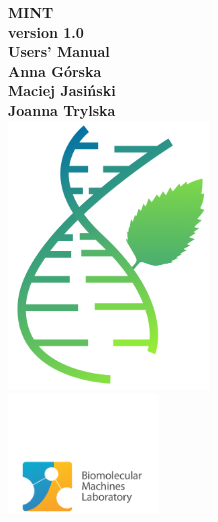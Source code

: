 \documentclass[12pt]{article}
\begin{document}
\begin{titlepage}
\centering
{{\Huge\bf \sffamily MINT}}\\
\vspace{0.35cm}
{{\Huge\bf \sffamily version 1.0}}\\
\vspace{0.5cm}
{{\Huge\bf \sffamily Users' Manual}}\\
\vspace{1cm}
{\large{\bf{\sffamily Anna G\'{o}rska}}}\\
{\large{\bf{\sffamily Maciej Jasi\'{n}ski}}}\\
{\large{\bf{\sffamily Joanna Trylska}}}\\
\vspace{2cm}
\includegraphics[width=0.4\textwidth]{./pictures/MINT.png}\\
\vspace{0.2cm}
\includegraphics[width=0.3\textwidth]{./pictures/logoLMB.png}
\end{titlepage}
\newpage
\end{document}
